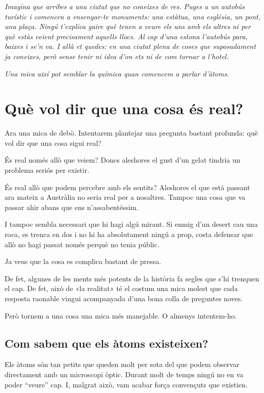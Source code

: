 
\textit{
Imagina que arribes a una ciutat que no coneixes de res. Puges a un autobús turístic i comencen a ensenyar-te monuments: una estàtua, una església, un pont, una plaça. Ningú t'explica gaire què tenen a veure els uns amb els altres ni per què estàs veient precisament aquells llocs. Al cap d'una estona l'autobús para, baixes i se'n va. I allà et quedes: en una ciutat plena de coses que suposadament ja coneixes, però sense tenir ni idea d'on ets ni de com tornar a l'hotel.
}

\textit{
Una mica així pot semblar la química quan comencem a parlar d'àtoms.
}

\section{Què vol dir que una cosa és real?}

Ara una mica de debò. Intentarem plantejar una pregunta bastant profunda: què vol dir que una cosa sigui real?

És real només allò que veiem? Doncs aleshores el gust d'un gelat tindria un problema seriós per existir.

És real allò que podem percebre amb els sentits? Aleshores el que està passant ara mateix a Austràlia no seria real per a nosaltres. Tampoc una cosa que va passar ahir abans que ens n'assabentéssim.

I tampoc sembla necessari que hi hagi algú mirant. Si enmig d'un desert cau una roca, es trenca en dos i no hi ha absolutament ningú a prop, costa defensar que allò no hagi passat només perquè no tenia públic.

Ja veus que la cosa es complica bastant de pressa.

De fet, algunes de les ments més potents de la història fa segles que s'hi trenquen el cap. De fet, això de «la realitat» té el costum una mica molest que cada resposta raonable vingui acompanyada d’una bona colla de preguntes noves.

Però tornem a una cosa una mica més manejable. O almenys intentem-ho.

\subsection{Com sabem que els àtoms existeixen?}

Els àtoms són tan petits que queden molt per sota del que podem observar directament amb un microscopi òptic. Durant molt de temps ningú no en va poder ``veure'' cap. I, malgrat això, vam acabar força convençuts que existien.

